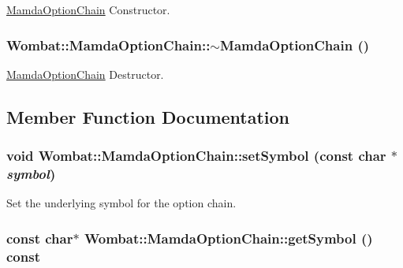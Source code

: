 \hyperlink{classWombat_1_1MamdaOptionChain}{Mamda\-Option\-Chain} Constructor. 

\hypertarget{classWombat_1_1MamdaOptionChain_1571f9e007a6fa33adfc6734201d18e9}{
\subsubsection[$\sim$MamdaOptionChain]{\setlength{\rightskip}{0pt plus 5cm}Wombat::Mamda\-Option\-Chain::$\sim$Mamda\-Option\-Chain ()}}
\label{classWombat_1_1MamdaOptionChain_1571f9e007a6fa33adfc6734201d18e9}


\hyperlink{classWombat_1_1MamdaOptionChain}{Mamda\-Option\-Chain} Destructor. 



\subsection{Member Function Documentation}
\hypertarget{classWombat_1_1MamdaOptionChain_73abe9e7b8d73a0f7508cd12fa1a763e}{
\subsubsection[setSymbol]{\setlength{\rightskip}{0pt plus 5cm}void Wombat::Mamda\-Option\-Chain::set\-Symbol (const char $\ast$ {\em symbol})}}
\label{classWombat_1_1MamdaOptionChain_73abe9e7b8d73a0f7508cd12fa1a763e}


Set the underlying symbol for the option chain. 

\hypertarget{classWombat_1_1MamdaOptionChain_a2d2a98a0f219cb7a83a273710bafa8e}{
\subsubsection[getSymbol]{\setlength{\rightskip}{0pt plus 5cm}const char$\ast$ Wombat::Mamda\-Option\-Chain::get\-Symbol () const}}
\label{classWombat_1_1MamdaOptionChain_a2d2a98a0f219cb7a83a273710bafa8e}


